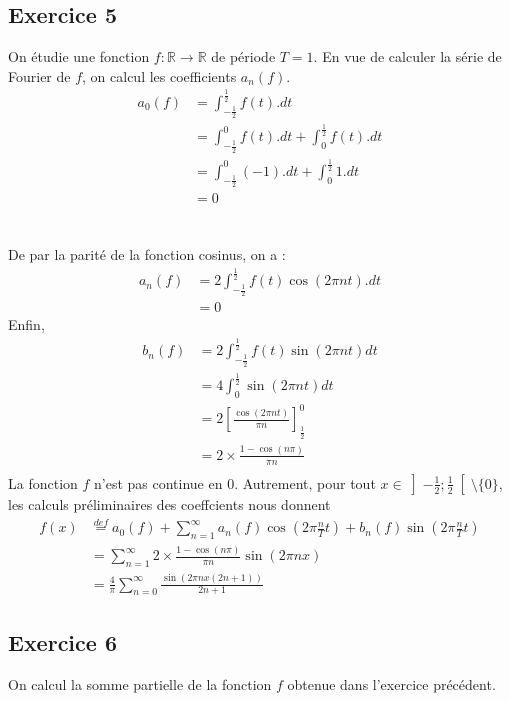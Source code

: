 \documentclass[a4paper,12pt]{article}
\begin{document}
\subsection{ Exercice 5}
On étudie une fonction $f: \mathbb{R} \rightarrow \mathbb{R}$ de période $T = 1$. En vue de calculer la série de Fourier de $f$, on calcul les coefficients $a_n(f)$.
\begin{align*}
  a_0(f)
  &=\int_{-\frac{1}{2}}^{\frac{1}{2}}f(t).dt\\
  &=\int_{-\frac{1}{2}}^{0}f(t).dt + \int_{0}^{\frac{1}{2}}f(t).dt\\
  &=\int_{-\frac{1}{2}}^{0}(-1).dt + \int_{0}^{\frac{1}{2}}1.dt \\
  &= 0
\end{align*}\\\\
De par la parité de la fonction cosinus, on a :
\begin{align*}
  a_n(f)
  &=2\int_{-\frac{1}{2}}^{\frac{1}{2}}f(t)\cos(2\pi nt).dt\\
  &=0
\end{align*}
Enfin,
\begin{align*}
  b_n(f)
  &=2\int_{-\frac{1}{2}}^{\frac{1}{2}}f(t)\sin(2\pi nt)dt\\
  &=4\int_0^{\frac{1}{2}}\sin(2\pi nt)dt\\
  &=2\left[\frac{\cos(2\pi nt)}{\pi n}\right]_{\frac{1}{2}}^0\\
  &=2\times\frac{1 - \cos(n\pi)}{\pi n}\\
\end{align*}
La fonction $f$ n'est pas continue en $0$. Autrement, pour tout $x \in \left]-\frac{1}{2};\frac{1}{2}\right[\setminus\{0\}$, les calculs préliminaires des coeffcients nous donnent
\begin{align*}
  f(x)
  &\overset{def}{=}a_{0}(f) + \sum_{n=1}^{\infty} a_{n}(f)\cos\left(2\pi\frac{n}{T}t\right) + b_{n}(f)\sin\left(2\pi\frac{n}{T}t\right)\\
  &=\sum_{n=1}^\infty2\times\frac{1 - \cos(n\pi)}{\pi n}\sin(2\pi nx)\\
  &=\frac{4}{\pi}\sum_{n=0}^\infty\frac{\sin(2\pi nx(2n+1))}{2n+1}
\end{align*}


\newpage
\subsection{ Exercice 6}

On calcul la somme partielle de la fonction $f$ obtenue dans l'exercice précédent.
\end{document}
